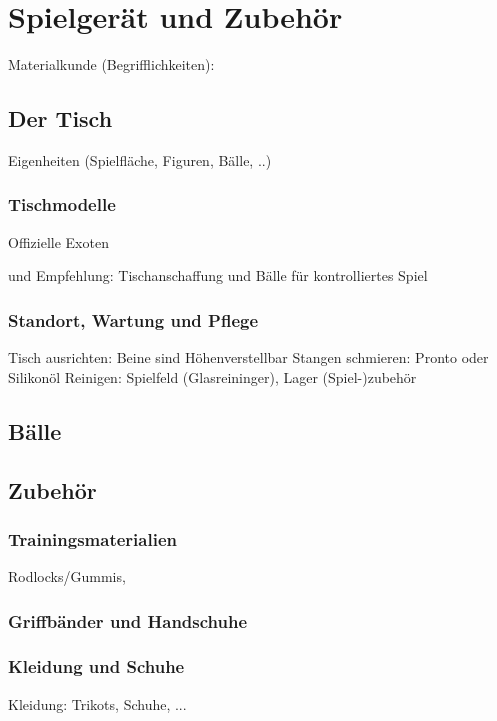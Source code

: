 \chapter{Spielgerät und Zubehör}

Materialkunde (Begrifflichkeiten):

\section{Der Tisch}
Eigenheiten (Spielfläche, Figuren, Bälle, ..)

\subsection{Tischmodelle}

Offizielle
Exoten

und Empfehlung: Tischanschaffung und Bälle für kontrolliertes Spiel

\subsection{Standort, Wartung und Pflege}

Tisch ausrichten: Beine sind Höhenverstellbar
Stangen schmieren: Pronto oder Silikonöl
Reinigen: Spielfeld (Glasreininger), Lager
(Spiel-)zubehör 

\section{Bälle}



\section{Zubehör}

\subsection{Trainingsmaterialien}
Rodlocks/Gummis,  

\subsection{Griffbänder und Handschuhe}

\subsection{Kleidung und Schuhe}
Kleidung: Trikots, Schuhe, ...
